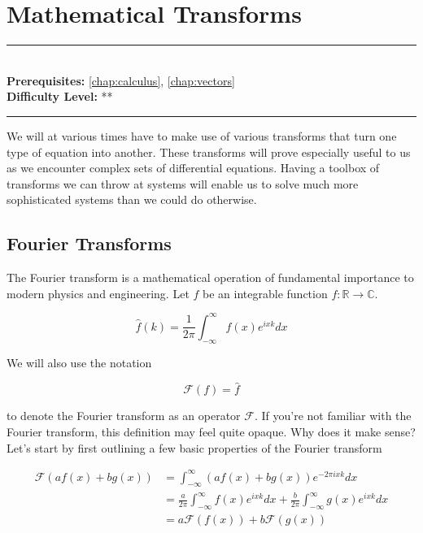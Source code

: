 \documentclass[book.tex]{subfiles}
\begin{document}
\chapter{Mathematical Transforms}
\label{chap:transforms}
\noindent\rule{11cm}{0.4pt} \\
\textbf{Prerequisites:}  \autoref{chap:calculus}, \autoref{chap:vectors} \\
\textbf{Difficulty Level:} ** \\
\noindent\rule{11cm}{0.4pt}
\vspace{5mm}

We will at various times have to make use of various transforms that turn one type of equation into another. These transforms will prove especially useful to us as we encounter complex sets of differential equations. Having a toolbox of transforms we can throw at systems will enable us to solve much more sophisticated systems than we could do otherwise.


\section{Fourier Transforms}

The Fourier transform is a mathematical operation of fundamental importance to modern physics and engineering. Let $f$ be an integrable function $f: \mathbb{R} \to \mathbb{C}$. 

\begin{equation}
    \hat{f}(k) = \frac{1}{2\pi} \int_{-\infty}^{\infty} f(x) e^{i x k} dx 
\end{equation}

We will also use the notation

\[ \mathcal{F}(f) = \hat{f} \]

to denote the Fourier transform as an operator $\mathcal{F}$. If you're not familiar with the Fourier transform, this definition may feel quite opaque. Why does it make sense? Let's start by first outlining a few basic properties of the Fourier transform

\begin{align}
    \mathcal{F}(a f(x) + b g(x)) &= \int_{-\infty}^{\infty} (a f(x) + b g(x))e^{-2\pi i x k} dx \\
    &= \frac{a}{2\pi} \int_{-\infty}^{\infty} f(x) e^{i x k} dx + \frac{b}{2\pi} \int_{-\infty}^{\infty} g(x) e^{i x k} dx \\
    &= a \mathcal{F}(f(x)) + b \mathcal{F}(g(x))
\end{align}
\end{document}
